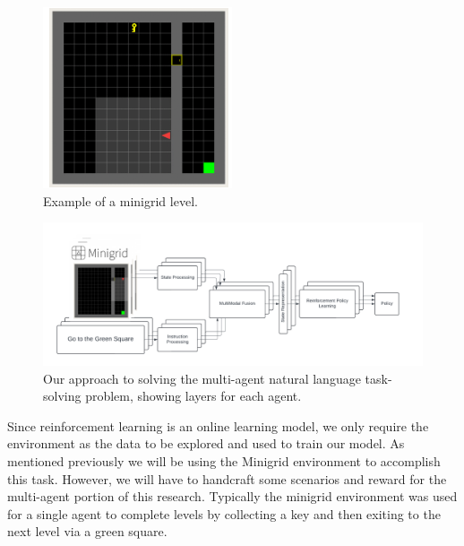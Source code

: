 \documentclass[11pt]{article}
\begin{document}
  
\begin{figure}[!h]
  \centering
  \includegraphics[width=\linewidth]{figs/minigridenv.png}
  \caption{Example of a minigrid level.}
  \label{fig:minigrid}
\end{figure}

\begin{figure}[!t]
  \centering
  \includegraphics[width=\linewidth]{figs/modeloverviewactual.pdf}
  \caption{Our approach to solving the multi-agent natural language task-solving problem, showing layers for each agent.}
  \label{fig:modeloverview}
\end{figure}

Since reinforcement learning is an online learning model, we only require the environment as the data to be explored and used to train our model. As mentioned previously we will be using the Minigrid environment to accomplish this task. However, we will have to handcraft some scenarios and reward for the multi-agent portion of this research. Typically the minigrid environment was used for a single agent to complete levels by collecting a key and then exiting to the next level via a green square. 
\end{document}
